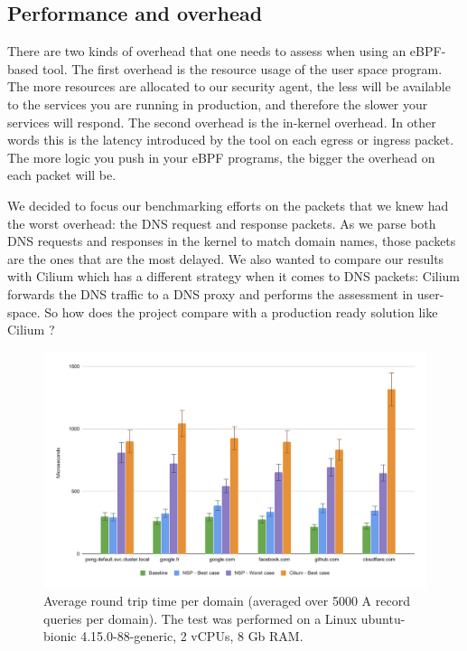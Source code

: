 \newpage

\subsection{Performance and overhead}

There are two kinds of overhead that one needs to assess when using an eBPF-based tool. The first overhead is the resource usage of the user space program. The more resources are allocated to our security agent, the less will be available to the services you are running in production, and therefore the slower your services will respond. The second overhead is the in-kernel overhead. In other words this is the latency introduced by the tool on each egress or ingress packet. The more logic you push in your eBPF programs, the bigger the overhead on each packet will be.

We decided to focus our benchmarking efforts on the packets that we knew had the worst overhead: the DNS request and response packets. As we parse both DNS requests and responses in the kernel to match domain names, those packets are the ones that are the most delayed. We also wanted to compare our results with Cilium which has a different strategy when it comes to DNS packets: Cilium forwards the DNS traffic to a DNS proxy and performs the assessment in user-space. So how does the project compare with a production ready solution like Cilium ?

\begin{figure}[h]
  \centering
    \includegraphics[width=\textwidth]{ProcessLevelNetworkSecurityMonitoring/img/round-trip-time.png}
  \caption*{Average round trip time per domain (averaged over 5000 A record queries per domain). The test was performed on a Linux ubuntu-bionic 4.15.0-88-generic, 2 vCPUs, 8 Gb RAM.}
  \label{fig:ProcessLevelNetworkSecurityMonitoring:round_trip_time}
\end{figure}

